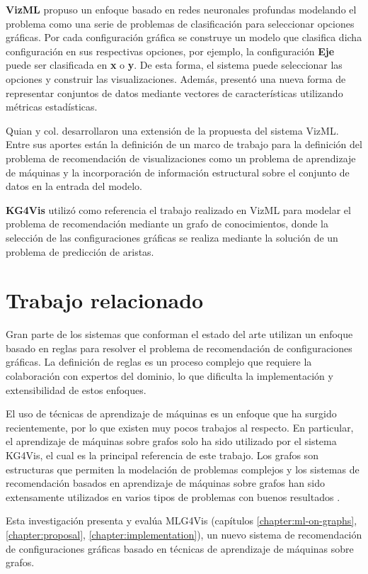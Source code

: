 \textbf{VizML} \cite{hu2019vizml} propuso un enfoque basado en redes neuronales profundas modelando
el problema como una serie de problemas de clasificaci\'on para seleccionar opciones gr\'aficas. Por cada
configuraci\'on gr\'afica se construye un modelo que clasifica dicha configuraci\'on en sus respectivas opciones, por ejemplo,
la configuraci\'on \textbf{Eje} puede ser clasificada en \textbf{x} o \textbf{y}. De esta forma, el sistema puede
seleccionar las opciones y construir las visualizaciones. Adem\'as,
present\'o una nueva forma de representar conjuntos de datos mediante vectores de caracter\'isticas utilizando
m\'etricas estad\'isticas.

Quian y col. \cite{qian2020ml} desarrollaron una extensi\'on de la propuesta del sistema VizML.
Entre sus aportes est\'an la definici\'on de un marco de trabajo para la definici\'on del problema
de recomendaci\'on de visualizaciones como un problema de aprendizaje de m\'aquinas y la incorporaci\'on
de informaci\'on estructural sobre el conjunto de datos en la entrada del modelo.

\textbf{KG4Vis} \cite{li2021kg4vis} utiliz\'o
como referencia el trabajo realizado en VizML para modelar el problema de recomendaci\'on
mediante un grafo de conocimientos, donde la selecci\'on de las configuraciones gr\'aficas se realiza
mediante la soluci\'on de un problema de predicci\'on de aristas.

\section{Trabajo relacionado}

Gran parte de los sistemas que conforman el estado del arte utilizan
un enfoque basado en reglas para resolver el problema de recomendaci\'on
de configuraciones gr\'aficas. La definici\'on de reglas es un proceso
complejo que requiere la colaboraci\'on con expertos del dominio, lo que
dificulta la implementaci\'on y extensibilidad de estos enfoques.

El uso de t\'ecnicas de aprendizaje de m\'aquinas es un enfoque 
que ha surgido recientemente, 
por lo que existen muy pocos trabajos al respecto. 
En particular,
el aprendizaje de m\'aquinas sobre grafos solo ha sido utilizado por el sistema KG4Vis, el cual
es la principal referencia de este trabajo.
Los grafos son estructuras que permiten la modelaci\'on
de problemas complejos y los
sistemas de recomendaci\'on basados en aprendizaje de m\'aquinas
sobre grafos han sido extensamente utilizados en varios tipos de problemas con buenos resultados \cite{guo2020survey}.

Esta investigaci\'on presenta y eval\'ua MLG4Vis (cap\'itulos \ref{chapter:ml-on-graphs}, \ref{chapter:proposal}, \ref{chapter:implementation}),
un nuevo sistema de recomendaci\'on de configuraciones gr\'aficas basado
en t\'ecnicas de aprendizaje de m\'aquinas sobre grafos.






